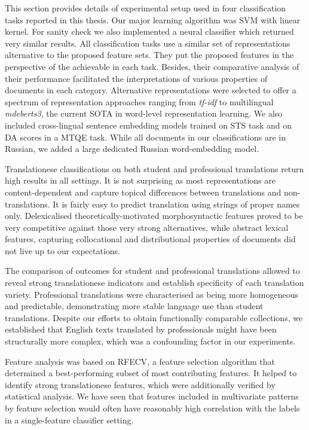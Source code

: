 This section provides details of experimental setup used in four classification tasks reported in this thesis. Our major learning algorithm was SVM with linear kernel. For sanity check we also implemented a neural classifier which returned very similar results. All classification tasks use a similar set of representations alternative to the proposed feature sets. They put the proposed features in the perspective of the achievable in each task. Besides, their comparative analysis of their performance facilitated the interpretations of various properties of documents in each category. Alternative representations were selected to offer a spectrum of representation approaches ranging from \textit{tf-idf} to multilingual \textit{mdeberts3}, the current SOTA in word-level representation learning. We also included cross-lingual sentence embedding models trained on \gls{STS} task and on DA scores in a MTQE task. While all documents in our classifications are in Russian, we added a large dedicated Russian word-embedding model.

Translationese classifications on both student and professional translations return high results in all settings. It is not surprising as most representations are content-dependent and capture topical differences between translations and non-translations. It is fairly easy to predict translation using strings of proper names only. Delexicalised theoretically-motivated morphosyntactic features proved to be very competitive against those very strong alternatives, while abstract lexical features, capturing collocational and distributional properties of documents did not live up to our expectations. 

The comparison of outcomes for student and professional translations allowed to reveal strong translationese indicators and establish specificity of each translation variety. Professional translations were characterised as being more homogeneous and predictable, demonstrating more stable language use than student translations. Despite our efforts to obtain functionally comparable collections, we established that English texts translated by professionals might have been structurally more complex, which was a confounding factor in our experiments.

Feature analysis was based on \gls{RFECV}, a feature selection algorithm that determined a best-performing subset of most contributing features. It helped to identify strong translationese features, which were additionally verified by statistical analysis. We have seen that features included in multivariate patterns by feature selection would often have reasonably high correlation with the labels in a single-feature classifier setting. 

